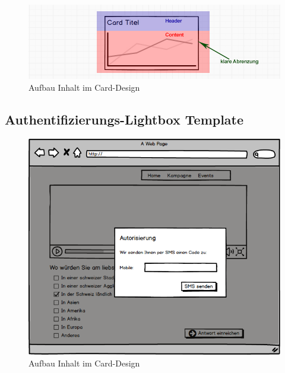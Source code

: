 \begin{figure}[htbp]
\centering
\includegraphics{images/mockups/card.jpg}
\caption{Aufbau Inhalt im Card-Design}
\end{figure}

\hypertarget{authentifizierungs-lightbox-template}{\subsection{Authentifizierungs-Lightbox
Template}\label{authentifizierungs-lightbox-template}}

\begin{figure}[htbp]
\centering
\includegraphics{images/mockups/Kundenimplementation-Desktop.png}
\caption{Aufbau Inhalt im Card-Design}
\end{figure}


